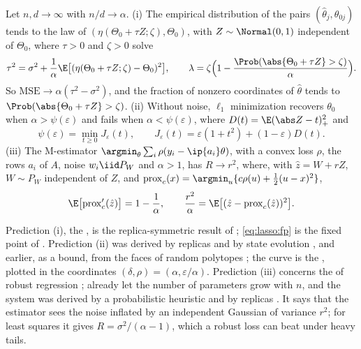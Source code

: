 \begin{refsection}
\begin{physicsbox}
Let $n,d\to\infty$ with $n/d\to\alpha$. \textup{(i)} The empirical distribution of the pairs $(\hat\theta_j,\theta_{0j})$ tends to the law of $(\eta(\Theta_0+\tau Z;\zeta),\Theta_0)$, with $Z\sim\Normal(0,1)$ independent of $\Theta_0$, where $\tau>0$ and $\zeta>0$ solve
\begin{equation}\label{eq:lasso:fp}
\tau^2=\sigma^2+\frac1\alpha\E\bigl[(\eta(\Theta_0+\tau Z;\zeta)-\Theta_0)^2\bigr],\qquad
\lambda=\zeta\Bigl(1-\frac{\Prob(\abs{\Theta_0+\tau Z}>\zeta)}\alpha\Bigr).
\end{equation}
So $\mathrm{MSE}\to\alpha(\tau^2-\sigma^2)$, and the fraction of nonzero coordinates of $\hat\theta$ tends to $\Prob(\abs{\Theta_0+\tau Z}>\zeta)$. \textup{(ii)} Without noise, $\ell_1$ minimization recovers $\theta_0$ when $\alpha>\psi(\varepsilon)$ and fails when $\alpha<\psi(\varepsilon)$, where $D(t)=\E(\abs Z-t)_+^2$ and
\begin{equation}\label{eq:lasso:psi}
\psi(\varepsilon)=\min_{t\ge0}J_\varepsilon(t),\qquad J_\varepsilon(t)=\varepsilon(1+t^2)+(1-\varepsilon)D(t).
\end{equation}
\textup{(iii)} The M-estimator $\argmin_\theta\sum_i\rho(y_i-\ip{a_i}\theta)$, with a convex loss $\rho$, the rows $a_i$ of $A$, noise $w_i\iid P_W$ and $\alpha>1$, has $R\to r^2$, where, with $\hat z=W+rZ$, $W\sim P_W$ independent of $Z$, and $\operatorname{prox}_c(x)=\argmin_u\{c\rho(u)+\frac12(u-x)^2\}$,
\begin{equation}\label{eq:lasso:mest}
\E\bigl[\operatorname{prox}_c'(\hat z)\bigr]=1-\frac1\alpha,\qquad \frac{r^2}\alpha=\E\bigl[(\hat z-\operatorname{prox}_c(\hat z))^2\bigr].
\end{equation}
\end{physicsbox}

Prediction (i), the , is the replica-symmetric result of \textcite{RanganFletcherGoyal2012}; \eqref{eq:lasso:fp} is the fixed point of \textcite{BayatiMontanari2012}. Prediction (ii) was derived by replicas \parencite{KabashimaEtAl2009} and by state evolution \parencite{DonohoMalekiMontanari2009}, and earlier, as a bound, from the faces of random polytopes \parencite{Donoho2006,DonohoTanner2009a}; the curve is the , plotted in the coordinates $(\delta,\rho)=(\alpha,\varepsilon/\alpha)$. Prediction (iii) concerns the  of robust regression \parencite{Huber1964}; \textcite{Huber1973} already let the number of parameters grow with $n$, and the system was derived by a probabilistic heuristic \parencite{ElKarouiEtAl2013} and by replicas \parencite{AdvaniGanguli2016}. It says that the estimator sees the noise inflated by an independent Gaussian of variance $r^2$; for least squares it gives $R=\sigma^2/(\alpha-1)$, which a robust loss can beat under heavy tails.


\end{refsection}
